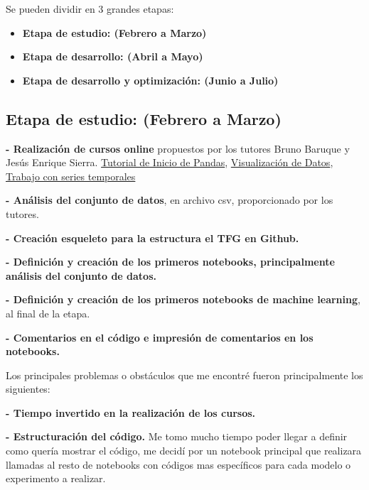 



Se pueden dividir en 3 grandes etapas:

\begin{itemize}
\tightlist
\item
	\textbf{Etapa de estudio: (Febrero a Marzo)}   	
\item
 	\textbf{Etapa de desarrollo: (Abril a Mayo)} 
\item
	\textbf{Etapa de desarrollo y optimización: (Junio a Julio)} 
\end{itemize}





\subsection{Etapa de estudio: (Febrero a Marzo)}




\textbf{- Realización de cursos online} propuestos por los tutores Bruno Baruque y Jesús Enrique Sierra.
\href{https://www.kaggle.com/learn/pandas}{Tutorial de Inicio de Pandas}, \href{https://www.kaggle.com/learn/data-visualization}{Visualización de Datos}, \href{https://www.kaggle.com/learn/time-series}{Trabajo con series temporales}

\textbf{- Análisis del conjunto de datos}, en archivo csv, proporcionado por los tutores.

\textbf{- Creación esqueleto para la estructura el TFG en Github.}

\textbf{- Definición y creación de los primeros notebooks, principalmente análisis del conjunto de datos.}

\textbf{- Definición y creación de los primeros notebooks de machine learning}, al final de la etapa.

\textbf{- Comentarios en el código e impresión  de comentarios en los notebooks.}

Los principales problemas o obstáculos que me encontré fueron principalmente los siguientes:

\textbf{- Tiempo invertido en la realización de los cursos.}

\textbf{- Estructuración del código.} Me tomo mucho tiempo poder llegar a definir como quería mostrar el código, me decidí por un notebook principal que realizara llamadas al resto de notebooks con códigos mas específicos para cada modelo o experimento a realizar.

